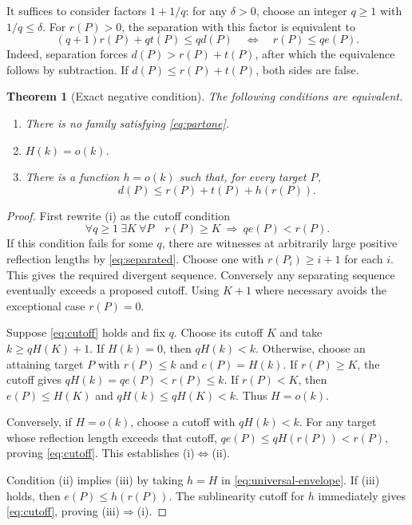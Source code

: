 \documentclass[11pt]{article}
\newtheorem{theorem}{Theorem}[section]
\theoremstyle{definition}
\theoremstyle{remark}
\begin{document}
It suffices to consider factors $1+1/q$: for any $\delta>0$, choose an
integer $q\ge1$ with $1/q\le\delta$. For $r(P)>0$, the separation with
this factor is equivalent to
\begin{equation}\label{eq:separated}
 (q+1)r(P)+qt(P)\le qd(P)
 \quad\Longleftrightarrow\quad r(P)\le q e(P).
\end{equation}
Indeed, separation forces $d(P)>r(P)+t(P)$, after which the equivalence
follows by subtraction. If $d(P)\le r(P)+t(P)$, both sides are false.

\begin{theorem}[Exact negative condition]\label{thm:envelope}
The following conditions are equivalent.
\begin{enumerate}[label=(\roman*)]
\item There is no family satisfying \eqref{eq:partone}.
\item $H(k)=o(k)$.
\item There is a function $h=o(k)$ such that, for every target $P$,
\[
 d(P)\le r(P)+t(P)+h(r(P)).
\]
\end{enumerate}
\end{theorem}
\begin{proof}
First rewrite (i) as the cutoff condition
\begin{equation}\label{eq:cutoff}
 \forall q\ge1\ \exists K\ \forall P\quad
 r(P)\ge K\ \Longrightarrow\ q e(P)<r(P).
\end{equation}
If this condition fails for some $q$, there are witnesses at arbitrarily
large positive reflection lengths by \eqref{eq:separated}. Choose one with
$r(P_i)\ge i+1$ for each $i$. This gives the required divergent sequence.
Conversely any separating sequence eventually exceeds a proposed cutoff.
Using $K+1$ where necessary avoids the exceptional case $r(P)=0$.

Suppose \eqref{eq:cutoff} holds and fix $q$. Choose its cutoff $K$ and take
$k\ge qH(K)+1$. If $H(k)=0$, then $qH(k)<k$. Otherwise, choose an
attaining target $P$ with $r(P)\le k$ and $e(P)=H(k)$.
If $r(P)\ge K$, the cutoff gives
$qH(k)=qe(P)<r(P)\le k$. If $r(P)<K$, then $e(P)\le H(K)$ and
$qH(k)\le qH(K)<k$. Thus $H=o(k)$.

Conversely, if $H=o(k)$, choose a cutoff with $qH(k)<k$. For any target
whose reflection length exceeds that cutoff,
$qe(P)\le qH(r(P))<r(P)$, proving \eqref{eq:cutoff}.
This establishes (i)$\Leftrightarrow$(ii).

Condition (ii) implies (iii) by taking $h=H$ in
\eqref{eq:universal-envelope}. If (iii) holds, then $e(P)\le h(r(P))$.
The sublinearity cutoff for $h$ immediately gives \eqref{eq:cutoff}, proving
(iii)$\Rightarrow$(i).
\end{proof}
\end{document}
